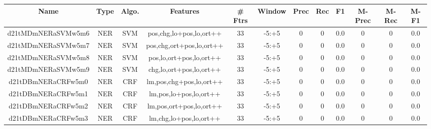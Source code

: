 \documentclass[a4paper]{article}
\begin{document}
\begin{landscape}
\begin{center}
\begin{tabular}{ |c|c|c|c|c|c|c|c|c|c|c|c|} 
 \hline
 	Name & Type & Algo. & Features & \# Ftrs & Window & Prec & Rec & F1 & M-Prec & M-Rec & M-F1\\
 \hline

 	

 
 	
 	\small{ d21tMDmNERaSVMw5m6 } & \small{ NER} & \small{  SVM }  & pos,chg,lo+pos,lo,ort++  &  33 &  \small{  -5:+5 }  &  0 & 0 & 0.0  &  0 & 0 & 0.0 \\
 	

 
 	
 	\small{ d21tMDmNERaSVMw5m7 } & \small{ NER} & \small{  SVM }  & pos,chg,ort+pos,lo,ort++  &  33 &  \small{  -5:+5 }  &  0 & 0 & 0.0  &  0 & 0 & 0.0 \\
 	

 
 	
 	\small{ d21tMDmNERaSVMw5m8 } & \small{ NER} & \small{  SVM }  & pos,lo,ort+pos,lo,ort++  &  33 &  \small{  -5:+5 }  &  0 & 0 & 0.0  &  0 & 0 & 0.0 \\
 	

 
 	
 	\small{ d21tMDmNERaSVMw5m9 } & \small{ NER} & \small{  SVM }  & chg,lo,ort+pos,lo,ort++  &  33 &  \small{  -5:+5 }  &  0 & 0 & 0.0  &  0 & 0 & 0.0 \\
 	

 
 	
 	\small{ d21tDBmNERaCRFw5m0 } & \small{ NER} & \small{  CRF }  & lm,pos,chg+pos,lo,ort++  &  33 &  \small{  -5:+5 }  &  0 & 0 & 0.0  &  0 & 0 & 0.0 \\
 	

 
 	
 	\small{ d21tDBmNERaCRFw5m1 } & \small{ NER} & \small{  CRF }  & lm,pos,lo+pos,lo,ort++  &  33 &  \small{  -5:+5 }  &  0 & 0 & 0.0  &  0 & 0 & 0.0 \\
 	

 
 	
 	\small{ d21tDBmNERaCRFw5m2 } & \small{ NER} & \small{  CRF }  & lm,pos,ort+pos,lo,ort++  &  33 &  \small{  -5:+5 }  &  0 & 0 & 0.0  &  0 & 0 & 0.0 \\
 	

 
 	
 	\small{ d21tDBmNERaCRFw5m3 } & \small{ NER} & \small{  CRF }  & lm,chg,lo+pos,lo,ort++  &  33 &  \small{  -5:+5 }  &  0 & 0 & 0.0  &  0 & 0 & 0.0 \\
 	


\end{tabular}
\end{center}
\end{landscape}
\end{document}
